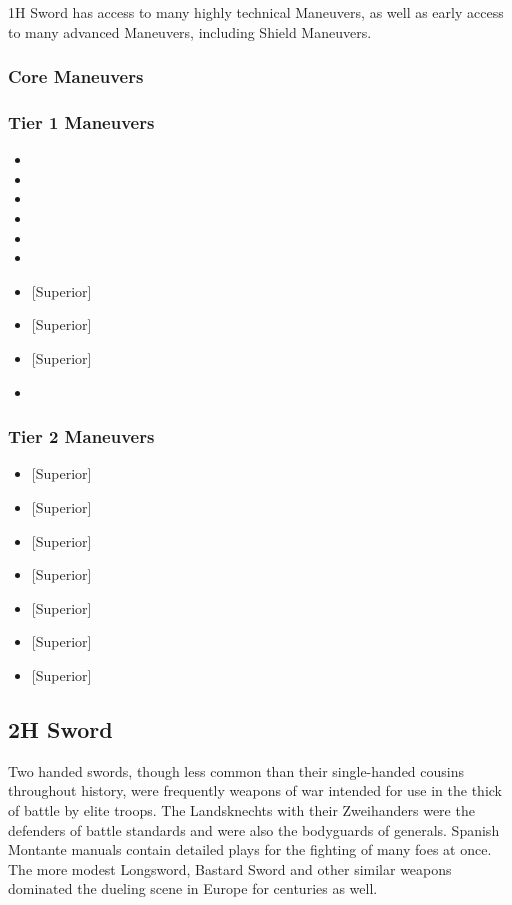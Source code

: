 \documentclass[oneside,11pt,english]{book}
\begin{document}
1H Sword has access to many highly technical Maneuvers, as well as early access to many advanced Maneuvers, including Shield Maneuvers.

\subsubsection{Core Maneuvers}

\subsubsection{Tier 1 Maneuvers}
\vspace{-5pt}\begin{itemize}
	[itemsep=0.5mm]
	\item {}
	\item {}
	\item {}
	\item {}
	\item {}
	\item {}
	\item {} [Superior]
	\item {} [Superior]
	\item {} [Superior]
	\item {}
\end{itemize}
\subsubsection{Tier 2 Maneuvers}
\vspace{-5pt}\begin{itemize}
	[itemsep=0.5mm]
	\item {} [Superior]
	\item {} [Superior]
	\item {} [Superior]
	\item {} [Superior]
	\item {} [Superior]
	\item {} [Superior]
	\item {} [Superior]
\end{itemize}

\subsection{2H Sword}
Two handed swords, though less common than their single-handed cousins throughout 
history, were frequently weapons of war intended for use in the thick of battle by elite troops. The Landsknechts with their Zweihanders were the defenders of battle standards and were also the bodyguards 
of generals. Spanish Montante manuals contain detailed plays for the fighting of many foes at once. The 
more modest Longsword, Bastard Sword and other similar weapons dominated the dueling scene in 
Europe for centuries as well. 
\end{document}
